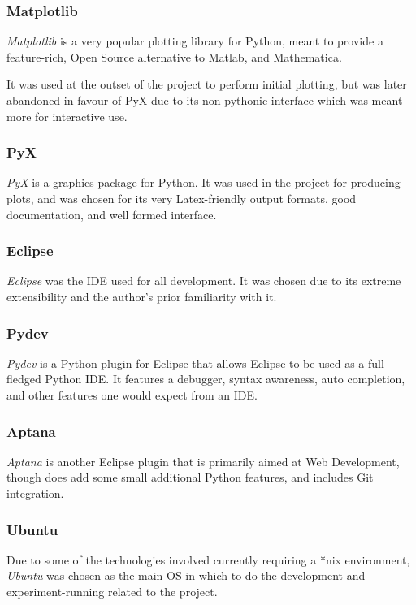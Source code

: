 \documentclass[a4paper,11pt]{report}
\begin{document}
\subsubsection*{Matplotlib}
\emph{Matplotlib}\citep{prog:matplotlib} is a very popular plotting library for Python, meant to provide a feature-rich, Open Source alternative to Matlab, and Mathematica.

It was used at the outset of the project to perform initial plotting, but was later abandoned in favour of PyX due to its non-pythonic interface which was meant more for interactive use.

\subsubsection*{PyX}
\emph{PyX}\citep{prog:pyx} is a graphics package for Python. It was used in the project for producing plots, and was chosen for its very Latex-friendly output formats, good documentation, and well formed interface.

\subsubsection*{Eclipse}
\emph{Eclipse} was the IDE used for all development. It was chosen due to its extreme extensibility and the author's prior familiarity with it.

\subsubsection*{Pydev}
\emph{Pydev}\citep{prog:pydev} is a Python plugin for Eclipse that allows Eclipse to be used as a full-fledged Python IDE. It features a debugger, syntax awareness, auto completion, and other features one would expect from an IDE.

\subsubsection*{Aptana}
\emph{Aptana} is another Eclipse plugin that is primarily aimed at Web Development, though does add some small additional Python features, and includes Git integration.

\subsubsection*{Ubuntu}
Due to some of the technologies involved currently requiring a *nix environment, \emph{Ubuntu}\citep{prog:ubuntu} was chosen as the main OS in which to do the development and experiment-running related to the project.
\end{document}
